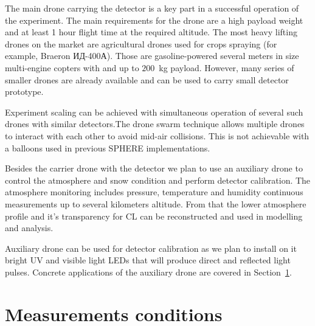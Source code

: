 \documentclass[a4paper,11pt]{article}
\begin{document}

The main drone carrying the detector is a key part in a successful operation of the experiment. The main requirements for the drone are a high payload weight and at least 1 hour flight time at the required altitude. The most heavy lifting drones on the market are agricultural drones used for crops spraying (for example, Braeron ИД-400А). Those are gasoline-powered several meters in size multi-engine copters with and up to $200$~kg payload. However, many series of smaller drones are already available and can be used to carry small detector prototype.

Experiment scaling can be achieved with simultaneous operation of several such drones with similar detectors.The drone swarm technique allows multiple drones to interact with each other to avoid mid-air collisions. This is not achievable with a balloons used in previous SPHERE implementations.


Besides the carrier drone with the detector we plan to use an auxiliary drone to control the atmosphere and snow condition and perform detector calibration. The atmosphere monitoring includes pressure, temperature and humidity continuous measurements up to several kilometers altitude. From that the lower atmosphere profile and it's transparency for CL can be reconstructed and used in modelling and analysis. 

Auxiliary drone can be used for detector calibration as we plan to install on it bright UV and visible light LEDs that will produce direct and reflected light pulses. Concrete applications of the auxiliary drone are covered in Section~\ref{sec:measurement-conditions}.

\section{Measurements conditions}
\label{sec:measurement-conditions}

\end{document}
